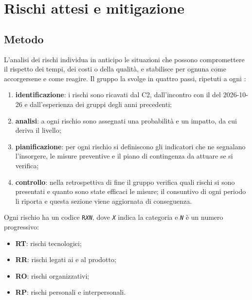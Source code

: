 \documentclass[documento]{gpt}
\begin{document}
\section{Rischi attesi e mitigazione}\label{sec:rischi}

\subsection{Metodo}
L'analisi dei rischi individua in anticipo le situazioni che possono
compromettere il rispetto dei tempi, dei costi o della qualità, e stabilisce
per ognuna come accorgersene e come reagire. Il gruppo la svolge in
quattro passi, ripetuti a ogni :
\begin{enumerate}
  \item \textbf{identificazione}: i rischi sono ricavati dal  C2,
        dall'incontro con il  del 2026-10-26 e
        dall'esperienza dei gruppi degli anni precedenti;
  \item \textbf{analisi}: a ogni rischio sono assegnati una probabilità e un
        impatto, da cui deriva il livello;
  \item \textbf{pianificazione}: per ogni rischio si definiscono gli
        indicatori che ne segnalano l'insorgere, le misure preventive e il
        piano di contingenza da attuare se si verifica;
  \item \textbf{controllo}: nella retrospettiva di fine  il
        gruppo verifica quali rischi si sono presentati e quanto sono state
        efficaci le misure; il consuntivo di ogni periodo li riporta e
        questa sezione viene aggiornata di conseguenza.
\end{enumerate}

Ogni rischio ha un codice \texttt{R\textit{XN}}, dove \texttt{\textit{X}}
indica la categoria e \texttt{\textit{N}} è un numero progressivo:
\begin{itemize}
  \item \textbf{RT}: rischi tecnologici;
  \item \textbf{RR}: rischi legati ai  e al prodotto;
  \item \textbf{RO}: rischi organizzativi;
  \item \textbf{RP}: rischi personali e interpersonali.
\end{itemize}
\end{document}
